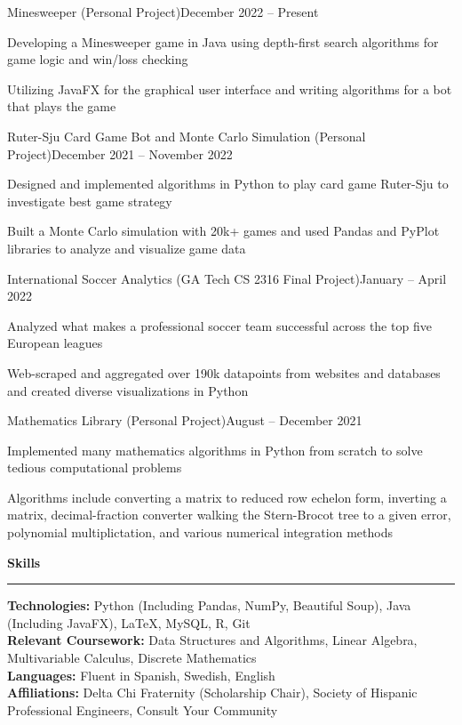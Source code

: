 \documentclass{article}
\newcommand{\horizontal}{\vspace{3pt}\hrule}
\newcommand{\sectitle}[1]{\vspace{3pt} \textbf{\large #1} \horizontal}
\newcommand{\skill}[2]{\textbf{#1:} #2}
\begin{document}
\begin{flushleft}
    \begin{subexperience}{Minesweeper (Personal Project)}{December 2022 -- Present}
        \item Developing a Minesweeper game in Java using depth-first search algorithms for game logic and win/loss checking
        \item Utilizing JavaFX for the graphical user interface and writing algorithms for a bot that plays the game
    \end{subexperience}

    \begin{subexperience}{Ruter-Sju Card Game Bot and Monte Carlo Simulation (Personal Project)}{December 2021 -- November 2022}
        \item Designed and implemented algorithms in Python to play card game Ruter-Sju to investigate best game strategy
        \item Built a Monte Carlo simulation with 20k+ games and used Pandas and PyPlot libraries to analyze and visualize game data
    \end{subexperience}

    \begin{subexperience}{International Soccer Analytics (GA Tech CS 2316 Final Project)}{January -- April 2022}
        \item Analyzed what makes a professional soccer team successful across the top five European leagues
        \item Web-scraped and aggregated over 190k datapoints from websites and databases and created diverse visualizations in Python
    \end{subexperience}

    \begin{subexperience}{Mathematics Library (Personal Project)}{August -- December 2021}
        \item Implemented many mathematics algorithms in Python from scratch to solve tedious computational problems
        \item Algorithms include converting a matrix to reduced row echelon form, inverting a matrix, decimal-fraction converter walking the Stern-Brocot tree to a given error, polynomial multiplictation, and various numerical integration methods
    \end{subexperience}

\sectitle{Skills}

    \vspace{3pt}
    \skill{Technologies}{Python (Including Pandas, NumPy, Beautiful Soup), Java (Including JavaFX), LaTeX, MySQL, R, Git} \\
    \skill{Relevant Coursework}{Data Structures and Algorithms, Linear Algebra, Multivariable Calculus, Discrete Mathematics} \\
    \skill{Languages}{Fluent in Spanish, Swedish, English} \\
    \skill{Affiliations}{Delta Chi Fraternity (Scholarship Chair), Society of Hispanic Professional Engineers, Consult Your Community}

\end{flushleft}
\end{document}
